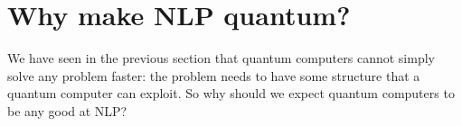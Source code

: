 
\section*{Why make NLP quantum?}

We have seen in the previous section that quantum computers cannot
simply solve any problem faster: the problem needs to have some
structure that a quantum computer can exploit. So why should we expect
quantum computers to be any good at NLP?
